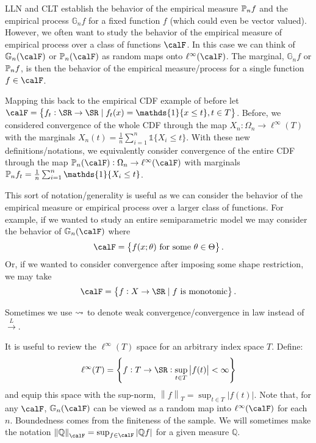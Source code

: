 \begin{example}
	\label{ex:calF}
	LLN and CLT establish the behavior of the empirical measure \(\P_nf\) and the empirical process \(\mathbb{G}_nf\) for a fixed function \(f\) (which could even be vector valued). However, we often want to study the behavior of the empirical measure of empirical process over a class of functions  \(\calF\). In this case we can think of  \(\mathbb{G}_n(\calF)\) or \(\P_n(\calF)\) as random maps onto \(\ell^\infty(\calF)\). The marginal, \(\mathbb{G}_nf\) or \(\P_nf\), is then the behavior of the empirical measure/process for a single function \(f\in\calF\).

	Mapping this back to the empirical CDF example of before let \(\calF = \left\{f_t:\SR\to \SR\mid f_t(x) = \mathds{1}\{x\leq t\}, t \in T\right\}\). Before, we considered convergence of the whole CDF through the map \(X_n:\Omega_n \to \ell^\infty(T)\) with the marginals \(X_n(t) = \frac{1}{n}\sum_{i=1}^n \mathds{1}\{X_i \leq t\}  \). With these new definitions/notations, we equivalently consider convergence of the entire CDF through the map \(\P_n(\calF):\Omega_n \to \ell^\infty(\calF)\) with marginals \(\P_nf_t = \frac{1}{n}\sum_{i=1}^n \mathds{1}\{X_i \leq t\} \).

	This sort of notation/generality is useful as we can consider the behavior of the empirical measure or empirical process over a larger class of functions. For example, if we wanted to study an entire semiparametric model we may consider the behavior of \(\mathbb{G}_n(\calF)\) where 
	\[
		\calF = \left\{f(x;\theta)\text{ for some }\theta\in\Theta\right\}
	.\]
	Or, if we wanted to consider convergence after imposing some shape restriction, we may take
	\[
		\calF = \left\{f:X\to\SR\mid f\text{ is monotonic}\right\}
	.\] 
\end{example}

\begin{remark*}[Notation]
	Sometimes we use \(\wcov\) to denote weak convergence/convergence in law instead of  \(\overset{L}{\to}\).	
\end{remark*}

\begin{remark*}
    \label{rem:def-recall}
	It is useful to review the \(\ell^\infty(T)\) space for an arbitrary index space  \(T\). Define:
	\begin{equation}
		\label{eq:ell-infty}
		\ell^\infty(T) = \left\{f:T\to\SR: \sup_{t\in T}\left|f(t)\right| <\infty\right\}
	\end{equation}
	and equip this space with the sup-norm, \(\left\|f\right\|_T = \sup_{t\in T}\left|f(t)\right|\). Note that, for any \(\calF\),  \(\mathbb{G}_n(\calF)\) can be viewed as a random map into \(\ell^\infty(\calF)\) for each \(n\). Boundedness comes from the finiteness of the sample. We will sometimes make the notation \(\left\|\mathbb{Q}\right\|_\calF = \sup_{f\in\calF}\left|\mathbb{Q}f\right|\) for a given measure \(\mathbb{Q}\).
\end{remark*}

